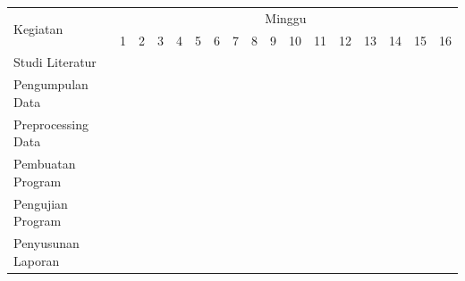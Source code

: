 \newcommand{\w}{}
\newcommand{\G}{\cellcolor{gray}}
\begin{table}[h!]
  \begin{tabular}{|p{3.5cm}|c|c|c|c|c|c|c|c|c|c|c|c|c|c|c|c|}

    \hline
    \multirow{2}{*}{Kegiatan} & \multicolumn{16}{|c|}{Minggu} \\
    \cline{2-17} &
    1 & 2 & 3 & 4 & 5 & 6 & 7 & 8 & 9 & 10 & 11 & 12 & 13 & 14 & 15 & 16 \\
    \hline

    Studi Literatur &
    \G & \G & \w & \w & \w & \w & \w & \w & \w & \w & \w & \w & \w & \w & \w & \w \\
    \hline

    Pengumpulan Data &
    \w & \G & \G & \w & \w & \w & \w & \w & \w & \w & \w & \w & \w & \w & \w & \w \\
    \hline

    Preprocessing Data &
    \w & \w & \G & \G & \G & \w & \w & \w & \w & \w & \w & \w & \w & \w & \w & \w \\
    \hline

    Pembuatan Program &
    \w & \w & \w & \w & \G & \G & \G & \G & \G & \G & \G & \G & \w & \w & \w & \w \\
    \hline

    Pengujian Program &
    \w & \w & \w & \w & \w & \w & \w & \w & \w & \w & \w & \G & \G & \G & \w & \w \\
    \hline

    Penyusunan \linebreak Laporan &
    \G & \G & \G & \G & \G & \G & \G & \G & \G & \G & \G & \G & \G & \G & \G & \G \\
    \hline

  \end{tabular}
  \label{tbl:timeline}
\end{table}